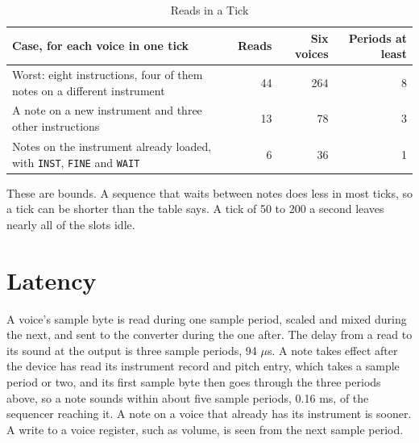 \begin{table}[H]
	\centering
	\small
	\begin{tabular}{p{7.4cm}rrr}
		\toprule
		\textbf{Case, for each voice in one tick}                                                   & \textbf{Reads} & \textbf{Six voices} & \textbf{Periods at least} \\
		\midrule
		Worst: eight instructions, four of them notes on a different instrument                     & 44             & 264                 & 8                         \\
		A note on a new instrument and three other instructions                                     & 13             & 78                  & 3                         \\
		Notes on the instrument already loaded, with \texttt{INST}, \texttt{FINE} and \texttt{WAIT} & 6              & 36                  & 1                         \\
		\bottomrule
	\end{tabular}
	\caption{Reads in a Tick}
	\label{tab:tick-limits}
\end{table}

These are bounds. A sequence that waits between notes does less in most ticks, so a tick can be shorter than the table
says. A tick of 50 to 200 a second leaves nearly all of the slots idle.

\section{Latency}

A voice's sample byte is read during one sample period, scaled and mixed during the next, and sent to the converter
during the one after. The delay from a read to its sound at the output is three sample periods, 94 $\mu$s. A note takes
effect after the device has read its instrument record and pitch entry, which takes a sample period or two, and its
first sample byte then goes through the three periods above, so a note sounds within about five sample periods, 0.16
ms, of the sequencer reaching it. A note on a voice that already has its instrument is sooner. A write to a voice
register, such as volume, is seen from the next sample period.
